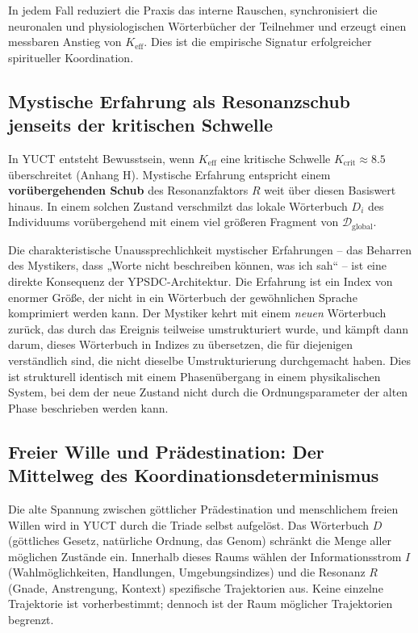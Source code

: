 \documentclass[12pt,a4paper]{article}
\begin{document}
	In jedem Fall reduziert die Praxis das interne Rauschen, synchronisiert die neuronalen und physiologischen Wörterbücher der Teilnehmer und erzeugt einen messbaren Anstieg von \(K_{\mathrm{eff}}\). Dies ist die empirische Signatur erfolgreicher spiritueller Koordination.
	
	\subsection{Mystische Erfahrung als Resonanzschub jenseits der kritischen Schwelle}
	
	In YUCT entsteht Bewusstsein, wenn \(K_{\mathrm{eff}}\) eine kritische Schwelle \(K_{\mathrm{crit}} \approx 8.5\) überschreitet (Anhang H). Mystische Erfahrung entspricht einem \textbf{vorübergehenden Schub} des Resonanzfaktors \(R\) weit über diesen Basiswert hinaus. In einem solchen Zustand verschmilzt das lokale Wörterbuch \(D_i\) des Individuums vorübergehend mit einem viel größeren Fragment von \(\mathcal{D}_{\text{global}}\).
	
	Die charakteristische Unaussprechlichkeit mystischer Erfahrungen – das Beharren des Mystikers, dass „Worte nicht beschreiben können, was ich sah“ – ist eine direkte Konsequenz der YPSDC-Architektur. Die Erfahrung ist ein Index von enormer Größe, der nicht in ein Wörterbuch der gewöhnlichen Sprache komprimiert werden kann. Der Mystiker kehrt mit einem \emph{neuen} Wörterbuch zurück, das durch das Ereignis teilweise umstrukturiert wurde, und kämpft dann darum, dieses Wörterbuch in Indizes zu übersetzen, die für diejenigen verständlich sind, die nicht dieselbe Umstrukturierung durchgemacht haben. Dies ist strukturell identisch mit einem Phasenübergang in einem physikalischen System, bei dem der neue Zustand nicht durch die Ordnungsparameter der alten Phase beschrieben werden kann.
	
	\subsection{Freier Wille und Prädestination: Der Mittelweg des Koordinationsdeterminismus}
	
	Die alte Spannung zwischen göttlicher Prädestination und menschlichem freien Willen wird in YUCT durch die Triade selbst aufgelöst. Das Wörterbuch \(D\) (göttliches Gesetz, natürliche Ordnung, das Genom) schränkt die Menge aller möglichen Zustände ein. Innerhalb dieses Raums wählen der Informationsstrom \(I\) (Wahlmöglichkeiten, Handlungen, Umgebungsindizes) und die Resonanz \(R\) (Gnade, Anstrengung, Kontext) spezifische Trajektorien aus. Keine einzelne Trajektorie ist vorherbestimmt; dennoch ist der Raum möglicher Trajektorien begrenzt.
	
\end{document}
